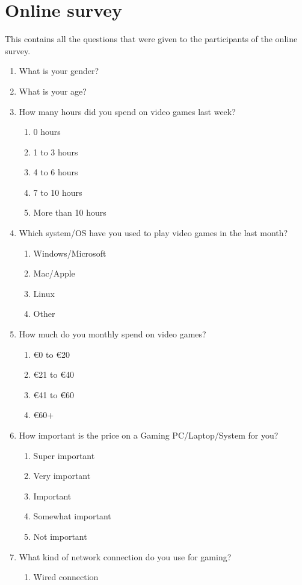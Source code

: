 \chapter{Online survey}
This contains all the questions that were given to the participants of the online survey.
\begin{enumerate}
	\item What is your gender?
	\item What is your age?
	\item How many hours did you spend on video games last week?
	\begin{enumerate}
		\item 0 hours
		\item 1 to 3 hours
		\item 4 to 6 hours
		\item 7 to 10 hours
		\item More than 10 hours
	\end{enumerate}
	\item Which system/OS have you used to play video games in the last month?
	\begin{enumerate}
		\item Windows/Microsoft
		\item Mac/Apple
		\item Linux
		\item Other
	\end{enumerate}
	\item How much do you monthly spend on video games?
	\begin{enumerate}
		\item €0 to €20
		\item €21 to €40
		\item €41 to €60
		\item €60+
	\end{enumerate}
	\item How important is the price on a Gaming PC/Laptop/System for you?
	\begin{enumerate}
		\item Super important
		\item Very important
		\item Important
		\item Somewhat important
		\item Not important
	\end{enumerate}
	\item What kind of network connection do you use for gaming?
	\begin{enumerate}
		\item Wired connection

\end{enumerate}
\end{enumerate}
